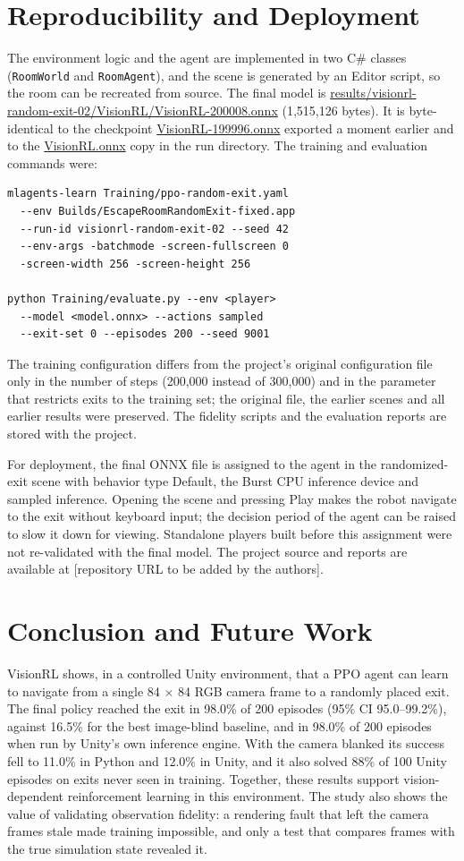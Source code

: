 \documentclass[conference]{IEEEtran}
\begin{document}
\section{Reproducibility and Deployment}\label{sec:repro}
The environment logic and the agent are implemented in two C\# classes (\texttt{RoomWorld} and \texttt{RoomAgent}), and the scene is generated by an Editor script, so the room can be recreated from source. The final model is \url{results/visionrl-random-exit-02/VisionRL/VisionRL-200008.onnx} (1,515,126 bytes). It is byte-identical to the checkpoint \url{VisionRL-199996.onnx} exported a moment earlier and to the \url{VisionRL.onnx} copy in the run directory. The training and evaluation commands were:

{\footnotesize
\begin{verbatim}
mlagents-learn Training/ppo-random-exit.yaml
  --env Builds/EscapeRoomRandomExit-fixed.app
  --run-id visionrl-random-exit-02 --seed 42
  --env-args -batchmode -screen-fullscreen 0
  -screen-width 256 -screen-height 256

python Training/evaluate.py --env <player>
  --model <model.onnx> --actions sampled
  --exit-set 0 --episodes 200 --seed 9001
\end{verbatim}}

The training configuration differs from the project's original configuration file only in the number of steps (200,000 instead of 300,000) and in the parameter that restricts exits to the training set; the original file, the earlier scenes and all earlier results were preserved. The fidelity scripts and the evaluation reports are stored with the project.

For deployment, the final ONNX file is assigned to the agent in the randomized-exit scene with behavior type Default, the Burst CPU inference device and sampled inference. Opening the scene and pressing Play makes the robot navigate to the exit without keyboard input; the decision period of the agent can be raised to slow it down for viewing. Standalone players built before this assignment were not re-validated with the final model. The project source and reports are available at [repository URL to be added by the authors].


\section{Conclusion and Future Work}\label{sec:concl}
VisionRL shows, in a controlled Unity environment, that a PPO agent can learn to navigate from a single 84 $\times$ 84 RGB camera frame to a randomly placed exit. The final policy reached the exit in 98.0\% of 200 episodes (95\% CI 95.0--99.2\%), against 16.5\% for the best image-blind baseline, and in 98.0\% of 200 episodes when run by Unity's own inference engine. With the camera blanked its success fell to 11.0\% in Python and 12.0\% in Unity, and it also solved 88\% of 100 Unity episodes on exits never seen in training. Together, these results support vision-dependent reinforcement learning in this environment. The study also shows the value of validating observation fidelity: a rendering fault that left the camera frames stale made training impossible, and only a test that compares frames with the true simulation state revealed it.
\end{document}
